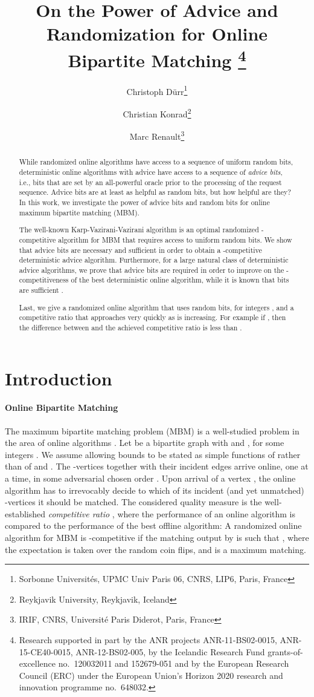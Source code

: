 \documentclass[a4paper]{article}
\title{On the Power of Advice and Randomization for Online Bipartite Matching \footnote{Research supported in part by the ANR projects ANR-11-BS02-0015,  ANR-15-CE40-0015, ANR-12-BS02-005, by the Icelandic Research Fund grants-of-excellence no.\ 120032011 and 152679-051 and by the European Research Council (ERC) under the European Union’s Horizon 2020 research and innovation programme no.\ 648032.}}
\author{Christoph D\"{u}rr\thanks{Sorbonne Universités, UPMC Univ Paris 06, CNRS, LIP6, Paris, France}
\and
Christian Konrad\thanks{Reykjavik University, Reykjavik, Iceland}
\and
Marc Renault\thanks{IRIF, CNRS,  Universit\'{e} Paris Diderot, Paris, France}}
\begin{document}
\maketitle

\begin{abstract}
While randomized online algorithms have access to a sequence of uniform random bits, deterministic
online algorithms with advice have access to a sequence of {\em advice bits}, i.e., bits that are set
by an all-powerful oracle prior to the processing of the request sequence.
Advice bits are at least as helpful as random bits, but how helpful are they? In this work, we investigate the
power of advice bits and random bits for online maximum bipartite matching (\textsc{MBM}).

The well-known Karp-Vazirani-Vazirani algorithm \cite{kvv90} is an optimal
randomized -competitive algorithm for \textsc{MBM} that requires access to
 uniform random bits. We show that  advice
bits are necessary and  sufficient in order to obtain a
-competitive deterministic advice algorithm. Furthermore,
for a large natural class of deterministic advice algorithms, we prove that
 advice bits are required in order to improve on the -competitiveness of
the best deterministic online algorithm, while it is known that 
bits are sufficient \cite{bkkk11}.

Last, we give a randomized online algorithm that uses  random bits, for integers ,
and a competitive ratio that approaches  very quickly as  is increasing.
For example if , then the difference between  and the achieved competitive ratio
is less than .
\end{abstract}

\section{Introduction}
\paragraph*{Online Bipartite Matching}
The maximum bipartite matching problem (\textsc{MBM}) is a well-studied problem in the area of online
algorithms \cite{kvv90,bm08,djk13}. Let  be a bipartite graph with
 and , for some integers . We
assume  allowing bounds to be stated as simple functions of  rather than of  and .
The -vertices together with their incident edges
arrive online, one at a time, in
some adversarial chosen order . Upon arrival of a vertex ,
the online algorithm has to irrevocably decide to which of its incident (and yet unmatched) -vertices
it should be matched.
The considered quality measure is the well-established {\em competitive ratio}
\cite{st85}, where
the performance of an online algorithm is compared to the performance of the best
offline algorithm: A randomized online algorithm  for \textsc{MBM}
is -competitive if the matching  output by  is such that
, where the expectation is taken over the random coin flips,
and  is a maximum matching.
\end{document}
